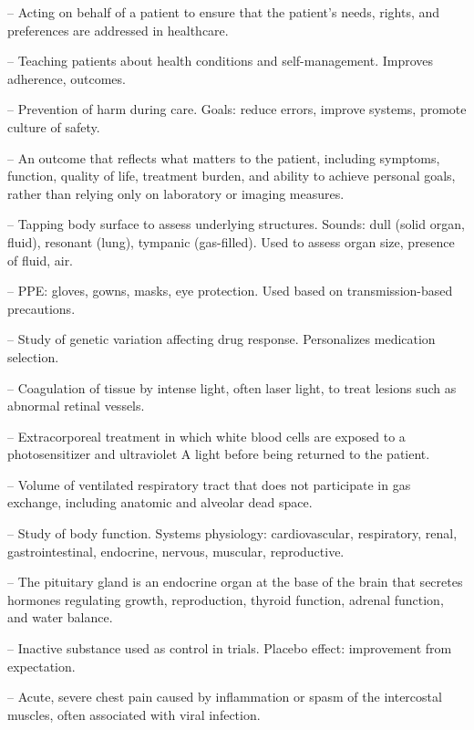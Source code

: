 -- Acting on behalf of a patient to ensure that the patient's needs, rights, and preferences are addressed in healthcare.

-- Teaching patients about health conditions and self-management. Improves adherence, outcomes.

-- Prevention of harm during care. Goals: reduce errors, improve systems, promote culture of safety.

-- An outcome that reflects what matters to the patient, including symptoms, function, quality of life, treatment burden, and ability to achieve personal goals, rather than relying only on laboratory or imaging measures.

-- Tapping body surface to assess underlying structures. Sounds: dull (solid organ, fluid), resonant (lung), tympanic (gas-filled). Used to assess organ size, presence of fluid, air.

-- PPE: gloves, gowns, masks, eye protection. Used based on transmission-based precautions.

-- Study of genetic variation affecting drug response. Personalizes medication selection.

-- Coagulation of tissue by intense light, often laser light, to treat lesions such as abnormal retinal vessels.

-- Extracorporeal treatment in which white blood cells are exposed to a photosensitizer and ultraviolet A light before being returned to the patient.

-- Volume of ventilated respiratory tract that does not participate in gas exchange, including anatomic and alveolar dead space.

-- Study of body function. Systems physiology: cardiovascular, respiratory, renal, gastrointestinal, endocrine, nervous, muscular, reproductive.

-- The pituitary gland is an endocrine organ at the base of the brain that secretes hormones regulating growth, reproduction, thyroid function, adrenal function, and water balance.

-- Inactive substance used as control in trials. Placebo effect: improvement from expectation.

-- Acute, severe chest pain caused by inflammation or spasm of the intercostal muscles, often associated with viral infection.

